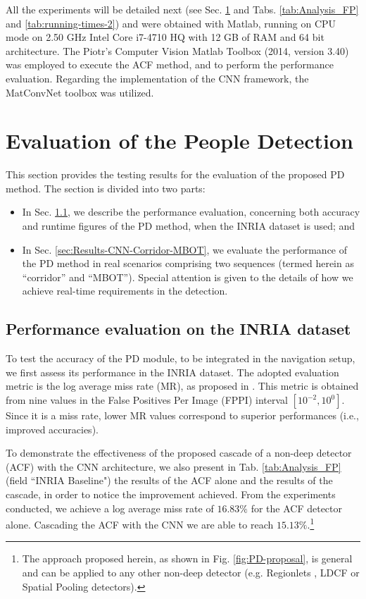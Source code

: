 \documentclass[5p,time]{elsarticle}
\begin{document}
All the experiments will be detailed next (see Sec.
\ref{sec:Experimental-results} and Tabs. \ref{tab:Analysis_FP} and \ref{tab:running-times-2}) and were
obtained with Matlab, running on CPU mode on 2.50 GHz Intel Core
i7-4710 HQ with 12 GB of RAM and 64 bit architecture. The Piotr's
Computer Vision Matlab Toolbox \cite{DollarToolbox} (2014, version
3.40) was employed to execute the ACF method, and to perform the
performance evaluation. Regarding the implementation of the CNN
framework, the MatConvNet toolbox \cite{vedaldi15matconvnet} was
utilized.


\section{Evaluation of the People Detection}\label{sec:Experimental-results}
This section provides the testing results for the evaluation of the proposed PD method. The section is divided into two parts:
\begin{itemize}
	\item{In Sec. \ref{sec:Results-CNN-INRIA}, we describe the performance evaluation, concerning both accuracy and runtime figures of the PD method, when the INRIA dataset is used; and} 
	\item{In Sec. \ref{sec:Results-CNN-Corridor-MBOT}, we evaluate the performance of the PD method in real scenarios comprising two sequences (termed herein as ``corridor'' and ``MBOT''). Special attention is given to the details of how we achieve real-time requirements in the detection.} 
\end{itemize}


\subsection{Performance evaluation on the INRIA dataset}\label{sec:Results-CNN-INRIA}

To test the accuracy of the PD module, to be integrated in the navigation setup, we first assess its performance in the INRIA dataset. The adopted evaluation metric is the log average miss rate (MR), as proposed in \cite{DollarPAMI2012}. This metric is obtained from nine values in the False Positives Per Image (FPPI) interval $[10^{-2},10^0]$. Since it is a miss rate, lower MR values correspond to superior performances (i.e., improved accuracies).

To demonstrate the effectiveness of the proposed cascade of a non-deep detector (ACF) with the CNN architecture, we
also present in Tab. \ref{tab:Analysis_FP} (field ``INRIA Baseline") the results of the ACF alone and the results of the cascade, in order to notice the improvement achieved.
From the experiments conducted, we achieve a log average miss rate of $16.83\%$ for the ACF detector alone. Cascading the ACF with the CNN we are able to reach $15.13\%$.\footnote{The approach proposed herein, as shown in Fig. \ref{fig:PD-proposal}, is general and can be applied to any other non-deep detector (e.g. Regionlets \cite{Wang2013}, LDCF \cite{NamNIPS2014} or Spatial Pooling \cite{Paisitkriangkrai2014} detectors).}
\end{document}
